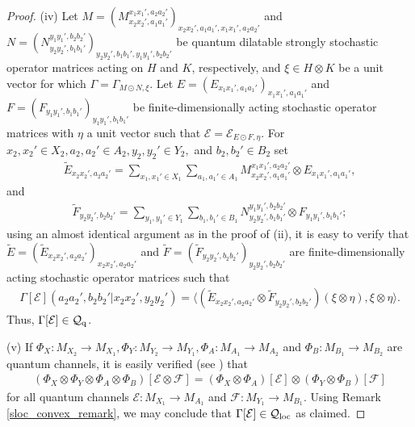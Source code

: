 \documentclass[11pt]{amsart}
\newcommand{\cl}[1]{\mathcal{#1}}
\begin{document}
\begin{proof}
(iv) Let $M = (M_{x_{2}x_{2}', a_{1}a_{1}'}^{x_{1}x_{1}', a_{2}a_{2}'})_{x_{2}x_{2}', a_{1}a_{1}', x_{1}x_{1}', a_{2}a_{2}'}$ and $N = (N_{y_{2}y_{2}', b_{1}b_{1}'}^{y_{1}y_{1}', b_{2}b_{2}'})_{y_{2}y_{2}', b_{1}b_{1}', y_{1}y_{1}', b_{2}b_{2}'}$ be quantum dilatable strongly stochastic operator matrices acting on $H$ and $K$, respectively, and $\xi \in H\otimes K$ be a unit vector for which $\Gamma = \Gamma_{M\odot N, \xi}$. Let $E = (E_{x_{1}x_{1}', a_{1}a_{1}'})_{x_{1}x_{1}', a_{1}a_{1}'}$ and $F = (F_{y_{1}y_{1}', b_{1}b_{1}'})_{y_{1}y_{1}', b_{1}b_{1}'}$ be finite-dimensionally acting stochastic operator matrices with $\eta$ a unit vector such that $\cl{E} = \cl{E}_{E\odot F, \eta}$. For $x_{2}, x_{2}' \in X_{2}, a_{2}, a_{2}' \in A_{2}, y_{2}, y_{2}' \in Y_{2},$ and $b_{2}, b_{2}' \in B_{2}$ set
\begin{gather*}
	\tilde{E}_{x_{2}x_{2}', a_{2}a_{2}'} = \sum\limits_{x_{1}, x_{1}' \in X_{1}}\sum\limits_{a_{1}, a_{1}' \in A_{1}}M_{x_{2}x_{2}', a_{1}a_{1}'}^{x_{1}x_{1}', a_{2}a_{2}'}\otimes E_{x_{1}x_{1}', a_{1}a_{1}'}, 
\end{gather*}
\noindent and
\begin{gather*}
	\tilde{F}_{y_{2}y_{2}', b_{2}b_{2}'} = \sum\limits_{y_{1}, y_{1}' \in Y_{1}}\sum\limits_{b_{1}, b_{1}' \in B_{1}}N_{y_{2}y_{2}', b_{1}b_{1}'}^{y_{1}y_{1}', b_{2}b_{2}'}\otimes F_{y_{1}y_{1}', b_{1}b_{1}'};
\end{gather*}
\noindent using an almost identical argument as in the proof of (ii), it is easy to verify that $\tilde{E} = (\tilde{E}_{x_{2}x_{2}', a_{2}a_{2}'})_{x_{2}x_{2}', a_{2}a_{2}'}$ and $\tilde{F} = (\tilde{F}_{y_{2}y_{2}', b_{2}b_{2}'})_{y_{2}y_{2}', b_{2}b_{2}'}$ are finite-dimensionally acting stochastic operator matrices such that 
\begin{gather*}
	\Gamma[\cl{E}](a_{2}a_{2}', b_{2}b_{2}'|x_{2}x_{2}', y_{2}y_{2}') = \big\langle (\tilde{E}_{x_{2}x_{2}', a_{2}a_{2}'}\otimes \tilde{F}_{y_{2}y_{2}', b_{2}b_{2}'})(\xi\otimes \eta), \xi\otimes \eta\big\rangle. 
\end{gather*}
\noindent Thus, $\Gamma[\cl{E}] \in \cl{Q}_{\rm q}$. 

(v) If $\Phi_{X}: M_{X_{2}}\rightarrow M_{X_{1}}, \Phi_{Y}: M_{Y_{2}}\rightarrow M_{Y_{1}}, \Phi_{A}: M_{A_{1}}\rightarrow M_{A_{2}}$ and $\Phi_{B}: M_{B_{1}}\rightarrow M_{B_{2}}$ are quantum channels, it is easily verified (see \cite{gt_one}) that
\begin{gather*}
	(\Phi_{X}\otimes \Phi_{Y}\otimes \Phi_{A}\otimes \Phi_{B})[\cl{E}\otimes \cl{F}] = (\Phi_{X}\otimes \Phi_{A})[\cl{E}]\otimes (\Phi_{Y}\otimes \Phi_{B})[\cl{F}]
\end{gather*}
\noindent for all quantum channels $\cl{E}: M_{X_{1}}\rightarrow M_{A_{1}}$ and $\cl{F}: M_{Y_{1}}\rightarrow M_{B_{1}}$. Using Remark \ref{sloc_convex_remark}, we may conclude that $\Gamma[\cl{E}] \in \cl{Q}_{\rm loc}$ as claimed. 
\end{proof}
\end{document}
